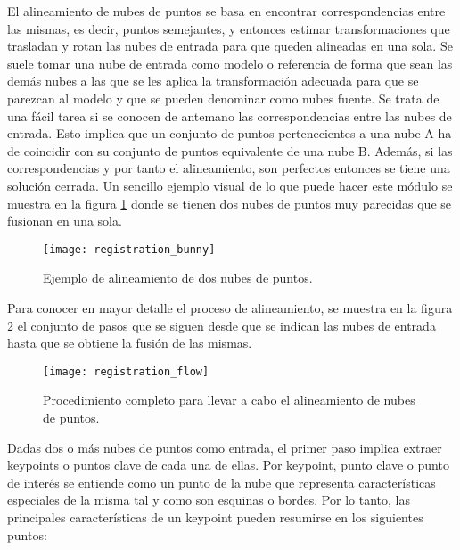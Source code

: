 El alineamiento de nubes de puntos se basa en encontrar correspondencias entre las mismas, es decir, puntos semejantes, y entonces estimar transformaciones que trasladan y rotan las nubes de entrada para que queden alineadas en una sola. Se suele tomar una nube de entrada como modelo o referencia de forma que sean las demás nubes a las que se les aplica la transformación adecuada para que se parezcan al modelo y que se pueden denominar como nubes fuente. Se trata de una fácil tarea si se conocen de antemano las correspondencias entre las nubes de entrada. Esto implica que un conjunto de puntos pertenecientes a una nube A ha de coincidir con su conjunto de puntos equivalente de una nube B. Además, si las correspondencias y por tanto el alineamiento, son perfectos entonces se tiene una solución cerrada. Un sencillo ejemplo visual de lo que puede hacer este módulo se muestra en la figura \ref{fig:registration_bunny} donde se tienen dos nubes de puntos muy parecidas que se fusionan en una sola. 


\begin{figure}
\centering
\texttt{[image: registration\_bunny]}
\caption{Ejemplo de alineamiento de dos nubes de puntos.}\label{fig:registration_bunny}
\end{figure}


Para conocer en mayor detalle el proceso de alineamiento, se muestra en la figura \ref{fig:registration_flow} el conjunto de pasos que se siguen desde que se indican las nubes de entrada hasta que se obtiene la fusión de las mismas.

\begin{figure}
\centering
\texttt{[image: registration\_flow]}
\caption{Procedimiento completo para llevar a cabo el alineamiento de nubes de puntos.}\label{fig:registration_flow}
\end{figure}


Dadas dos o más nubes de puntos como entrada, el primer paso implica extraer keypoints o puntos clave de cada una de ellas. Por keypoint, punto clave o punto de interés se entiende como un punto de la nube que representa características especiales de la misma tal y como son esquinas o bordes. Por lo tanto, las principales características de un keypoint pueden resumirse en los siguientes puntos:


